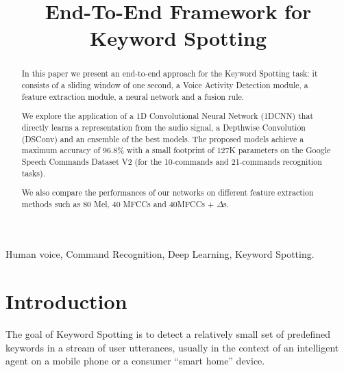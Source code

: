 \documentclass[conference]{IEEEtran}
\begin{document}
\title{End-To-End Framework for Keyword Spotting}
\author{
\and
{}
}

\maketitle

\begin{abstract}
In this paper we present an end-to-end approach for the Keyword Spotting task: it consists of a sliding window of one second, a Voice Activity Detection module, a feature extraction module, a neural network and a fusion rule.

We explore the application of a 1D Convolutional Neural Network (1DCNN) that directly learns a representation from the audio signal, a Depthwise Convolution (DSConv) and an ensemble of the best models.
The proposed models achieve a maximum accuracy of 96.8\% with a small footprint of 127K parameters on the Google Speech Commands Dataset V2 (for the 10-commands and 21-commands recognition tasks).

We also compare the performances of our networks on different feature extraction methods such as 80 Mel, 40 MFCCs and 40MFCCs + $\Delta$s.
\end{abstract}

\IEEEpeerreviewmaketitle
\begin{IEEEkeywords}
Human voice, Command Recognition, Deep Learning, Keyword Spotting.
\end{IEEEkeywords}

\section{Introduction}
The goal of Keyword Spotting is to detect a relatively small set of predefined keywords in a stream of user utterances, usually in the context of an intelligent agent on a mobile phone or a consumer “smart home” device.
\end{document}
